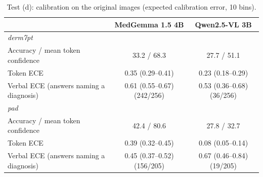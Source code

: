 \begin{table}[H]\centering\small
\caption{Test (d): calibration on the original images (expected calibration error, 10 bins).}\label{tab:calibration}
\begin{tabular}{lcc}\toprule
 & MedGemma 1.5 4B & Qwen2.5-VL 3B \\\midrule
\textit{derm7pt} &  &  \\
\quad Accuracy / mean token confidence & 33.2 / 68.3 & 27.7 / 51.1 \\
\quad Token ECE & 0.35 (0.29--0.41) & 0.23 (0.18--0.29) \\
\quad Verbal ECE (answers naming a diagnosis) & 0.61 (0.55--0.67) (242/256) & 0.53 (0.36--0.68) (36/256) \\
\textit{pad} &  &  \\
\quad Accuracy / mean token confidence & 42.4 / 80.6 & 27.8 / 32.7 \\
\quad Token ECE & 0.39 (0.32--0.45) & 0.08 (0.05--0.14) \\
\quad Verbal ECE (answers naming a diagnosis) & 0.45 (0.37--0.52) (156/205) & 0.67 (0.46--0.84) (19/205) \\
\bottomrule\end{tabular}\end{table}
